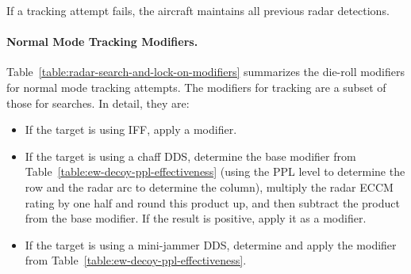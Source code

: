 {If a tracking attempt fails, the aircraft maintains all previous radar detections.


\paragraph{Normal Mode Tracking Modifiers.} Table~\ref{table:radar-search-and-lock-on-modifiers} summarizes the die-roll modifiers for normal mode tracking attempts. The modifiers for tracking are a subset of those for searches. In detail, they are:

\begin{itemize}
    \item If the target is using IFF, apply a  modifier.

    \item If the target is using a chaff DDS, determine the base modifier from Table~\ref{table:ew-decoy-ppl-effectiveness} (using the PPL level to determine the row and the radar arc to determine the column), multiply the radar ECCM rating by one half and round this product up, and then subtract the product from the base modifier. If the result is positive, apply it as a modifier.

    \item If the target is using a mini-jammer DDS, determine and apply the modifier from Table~\ref{table:ew-decoy-ppl-effectiveness}.

\end{itemize}

}
